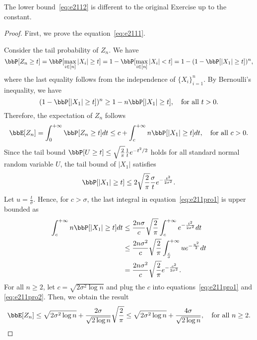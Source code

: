 \documentclass[11pt]{article}
\theoremstyle{plain}
\theoremstyle{definition}
\begin{document}
The lower bound~\eqref{eq:e2112} is different to the original Exercise up to the constant.

\begin{proof}
	First, we prove the equation~\eqref{eq:e2111}.
	
	\vspace{0.2cm}
	Consider the tail probability of $Z_n$. We have
	\begin{equation}
		\bbP[Z_n \geq t] = \bbP[\max_{i \in [n]} |X_i| \geq t] = 1 - \bbP[\max_{i \in [n]} |X_i| < t] = 1 - (1- \bbP[|X_1| \geq t])^n,
	\end{equation}
	where the last equality follows from the independence of $\{X_i\}_{i=1}^n$. By Bernoulli's inequality, we have
	\begin{equation}
		(1- \bbP[|X_1| \geq t])^n \geq 1 - n \bbP[|X_1| \geq t], \quad \text{for all } t >0.
	\end{equation} 
	Therefore, the expectation of $Z_n$ follows
	\begin{equation}\label{eq:e211pro1}
		\bbE[Z_n] = \int_{0}^{+\infty} \bbP[Z_n \geq t] dt \leq  c +  \int_{c}^{+\infty} n\bbP[|X_1| \geq t] dt, \quad \text{for all } c > 0.
	\end{equation}
	 Since the tail bound $\bbP[U \geq t] \leq \sqrt{\frac{2}{\pi}} \frac{1}{t} e^{-t^2 /2}$ holds for all standard normal random variable $U$, the tail bound of $|X_1|$ satisfies
	 \begin{equation}\label{eq:e211proupper}
	 	\bbP[|X_1| \geq t] \leq 2 \sqrt{\frac{2}{\pi}} \frac{\sigma}{t} e^{-\frac{t^2}{2\sigma^2}}.
	 \end{equation}
	Let $ u = \frac{ t}{\sigma}$. Hence, for $c > \sigma$, the last integral in equation~\eqref{eq:e211pro1} is upper bounded as
	 \begin{align}
	 	 \int_{c}^{+\infty} n\bbP[|X_1| \geq t] dt &\leq \frac{2n \sigma}{c} \sqrt{\frac{2}{\pi}} \int_{c}^{+\infty} e^{-\frac{t^2}{2\sigma^2} }dt \\  
	 	 & \leq \frac{2n \sigma^2}{c} \sqrt{\frac{2}{\pi}}   \int_{\frac{c}{\sigma}}^{+\infty} u e^{-\frac{u^2}{2}} dt \\
	 	 & = \frac{2n \sigma^2}{c} \sqrt{\frac{2}{\pi}}  e^{-\frac{c^2}{2\sigma^2}}. \label{eq:e211pro2}
	 \end{align}
	 For all $n \geq 2$, let $c = \sqrt{2\sigma^2 \log n}$ and plug the $c$ into equations~\eqref{eq:e211pro1} and \eqref{eq:e211pro2}. Then, we obtain the result
	 \begin{equation}
	 	\bbE[Z_n] \leq \sqrt{2\sigma^2 \log n} + \frac{2\sigma}{\sqrt{2\log n}}   \sqrt{\frac{2}{\pi}}  \leq \sqrt{2\sigma^2 \log n} + \frac{4\sigma}{\sqrt{2\log n}}, \quad \text{for all }n \geq 2.
	 \end{equation}
	 

\end{proof}
\end{document}
